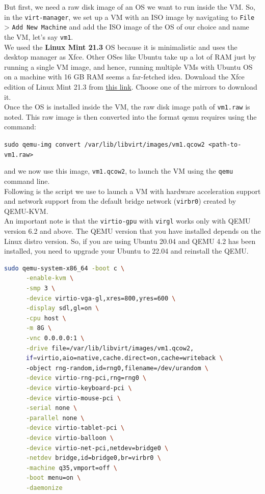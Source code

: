 \documentclass[a4paper,12pt, final]{report}
\begin{document}
\noindent But first, we need a raw disk image of an OS we want to run inside the VM. So, in the \verb|virt-manager|, we set up a VM with an ISO image by navigating to \texttt{File} > \texttt{Add New Machine} and add the ISO image of the OS of our choice and name the VM, let's say \verb|vm1|.\\

\noindent We used the \textbf{Linux Mint 21.3} OS because it is minimalistic and uses the desktop manager as Xfce. Other OSes like Ubuntu take up a lot of RAM just by running a single VM image, and hence, running multiple VMs with Ubuntu OS on a machine with 16 GB RAM seems a far-fetched idea. Download the Xfce edition of Linux Mint 21.3 from \href{https://www.linuxmint.com/edition.php?id=313}{this link}. Choose one of the mirrors to download it.\\

\noindent Once the OS is installed inside the VM, the raw disk image path of \verb|vm1.raw| is noted. This raw image is then converted into the format qemu requires using the command:

\noindent \verb|sudo qemu-img convert /var/lib/libvirt/images/vm1.qcow2 <path-to-vm1.raw>|

\noindent and we now use this image, \verb|vm1.qcow2|, to launch the VM using the \verb|qemu| command line.\\

\noindent Following is the script we use to launch a VM with hardware acceleration support and network support from the default bridge network (\verb|virbr0|) created by QEMU-KVM.\\

\noindent An important note is that the \verb|virtio-gpu| with \verb|virgl| works only with QEMU version 6.2 and above. The QEMU version that you have installed depends on the Linux distro version. So, if you are using Ubuntu 20.04 and QEMU 4.2 has been installed, you need to upgrade your Ubuntu to 22.04 and reinstall the QEMU.\\

\newpage

\begin{mdframed}[backgroundcolor=cyan!20]
    \begin{lstlisting}[language=bash]
sudo qemu-system-x86_64 -boot c \
      -enable-kvm \
      -smp 3 \
      -device virtio-vga-gl,xres=800,yres=600 \
      -display sdl,gl=on \
      -cpu host \
      -m 8G \
      -vnc 0.0.0.0:1 \
      -drive file=/var/lib/libvirt/images/vm1.qcow2,
      if=virtio,aio=native,cache.direct=on,cache=writeback \
      -object rng-random,id=rng0,filename=/dev/urandom \
      -device virtio-rng-pci,rng=rng0 \
      -device virtio-keyboard-pci \
      -device virtio-mouse-pci \
      -serial none \
      -parallel none \
      -device virtio-tablet-pci \
      -device virtio-balloon \
      -device virtio-net-pci,netdev=bridge0 \
      -netdev bridge,id=bridge0,br=virbr0 \
      -machine q35,vmport=off \
      -boot menu=on \
      -daemonize
    \end{lstlisting}
\end{mdframed}
\end{document}

